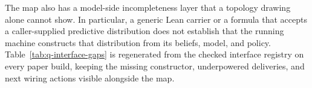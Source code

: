 The map also has a model-side incompleteness layer that a topology drawing
alone cannot show.  In particular, a generic Lean carrier or a formula that
accepts a caller-supplied predictive distribution does not establish that the
running machine constructs that distribution from its beliefs, model, and
policy.  Table~\ref{tab:q-interface-gaps} is regenerated from the checked
interface registry on every paper build, keeping the missing constructor,
underpowered deliveries, and next wiring actions visible alongside the map.


